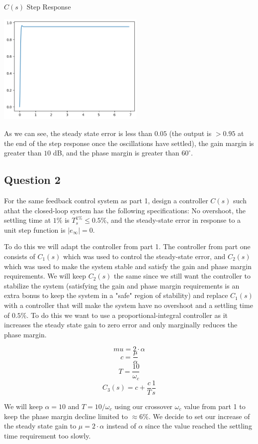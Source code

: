 \documentclass[11pt]{article}
\begin{document}
$C(s)$ Step Response

\includegraphics[width=200pt]{a4_5.png}

As we can see, the steady state error is less than $0.05$ (the output is $> 0.95$ at the end of the step response once the oscillations have settled), the gain margin is greater than $10$ dB, and the phase margin is greater than $60^\circ$.

\subsection{Question 2}

For the same feedback control system as part 1, design a controller $C(s)$ such athat the closed-loop system has the following specifications: No overshoot, the settling time at $1\%$ is $T_s^{1\%} \leq 0.5\%$, and the steady-state error in response to a unit step function is $|e_\infty| = 0$.

To do this we will adapt the controller from part 1. The controller from part one consists of $C_1(s)$ which was used to control the steady-state error, and $C_2(s)$ which was used to make the system stable and satisfy the gain and phase margin requirements. We will keep $C_2(s)$ the same since we still want the controller to stabilize the system (satisfying the gain and phase margin requirements is an extra bonus to keep the system in a "safe" region of stability) and replace $C_1(s)$ with a controller that will make the system have no overshoot and a settling time of $0.5\%$. To do this we want to use a proportional-integral controller as it increases the steady state gain to zero error and only marginally reduces the phase margin.

\[ mu = 2 \cdot \alpha \]
\[ c = \dfrac{\mu}{\alpha} \]
\[ T = \dfrac{10}{\omega_c} \]
\[ C_3(s) = c + \dfrac{c}{T} \dfrac{1}{s} \]

We will keep $\alpha = 10$ and $T = 10 / \omega_c$ using our crossover $\omega_c$ value from part 1 to keep the phase margin decline limited to $\approx 6\%$. We decide to set our increase of the steady state gain to $\mu = 2 \cdot \alpha$ instead of $\alpha$ since the value reached the settling time requirement too slowly.
\end{document}
